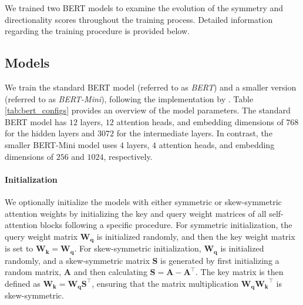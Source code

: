 We trained two BERT models \citep{devlinBERTPretrainingDeep2019} to examine the evolution of the symmetry and directionality scores throughout the training process. Detailed information regarding the training procedure is provided below.

\subsection{Models}\label{sec:exp_bertmodels_models}
%


We train the standard BERT model (referred to as \emph{BERT}) and a smaller version (referred to as \emph{BERT-Mini}), following the implementation by \citep{devlinBERTPretrainingDeep2019}. 
Table \ref{tab:bert_configs} provides an overview of the model parameters. 
The standard BERT model has $12$ layers, $12$ attention heads, and embedding dimensions of $768$ for the hidden layers and $3072$ for the intermediate layers. In contrast, the smaller BERT-Mini model uses $4$ layers, $4$ attention heads, and embedding dimensions of $256$ and $1024$, respectively.

\paragraph{Initialization}
We optionally initialize the models with either symmetric or skew-symmetric attention weights by initializing the key and query weight matrices of all self-attention blocks following a specific procedure.
For symmetric initialization, the query weight matrix $\bm{W_q}$ is initialized randomly, and then the key weight matrix is set to $\bm{W_k} = \bm{W_q}$.
For skew-symmetric initialization, $\bm{W_q}$ is initialized randomly, and a skew-symmetric matrix $\bm{S}$ is generated by first initializing a random matrix, $\bm{A}$ and then calculating \(\bm{S} = \bm{A} - \bm{A}^\top\). The key matrix is then defined as $\bm{W_k} = \bm{W_q} \bm{S}^\top$, ensuring that the matrix multiplication $\bm{W_q} \bm{W_k}^\top$ is skew-symmetric.

